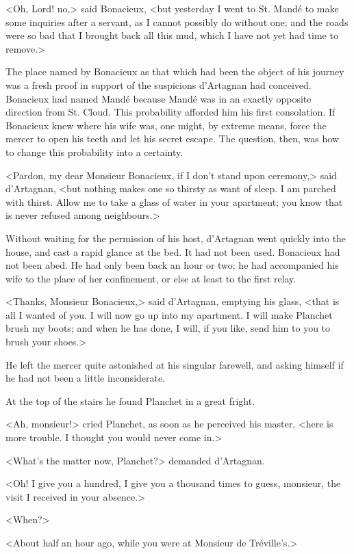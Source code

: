 <Oh, Lord! no,> said Bonacieux, <but yesterday I went to St. Mandé to make some inquiries after a servant, as I cannot possibly do without one; and the roads were so bad that I brought back all this mud, which I have not yet had time to remove.> 

The place named by Bonacieux as that which had been the object of his journey was a fresh proof in support of the suspicions d'Artagnan had conceived. Bonacieux had named Mandé because Mandé was in an exactly opposite direction from St. Cloud. This probability afforded him his first consolation. If Bonacieux knew where his wife was, one might, by extreme means, force the mercer to open his teeth and let his secret escape. The question, then, was how to change this probability into a certainty. 

<Pardon, my dear Monsieur Bonacieux, if I don't stand upon ceremony,> said d'Artagnan, <but nothing makes one so thirsty as want of sleep. I am parched with thirst. Allow me to take a glass of water in your apartment; you know that is never refused among neighbours.> 

Without waiting for the permission of his host, d'Artagnan went quickly into the house, and cast a rapid glance at the bed. It had not been used. Bonacieux had not been abed. He had only been back an hour or two; he had accompanied his wife to the place of her confinement, or else at least to the first relay. 

<Thanks, Monsieur Bonacieux,> said d'Artagnan, emptying his glass, <that is all I wanted of you. I will now go up into my apartment. I will make Planchet brush my boots; and when he has done, I will, if you like, send him to you to brush your shoes.> 

He left the mercer quite astonished at his singular farewell, and asking himself if he had not been a little inconsiderate. 

At the top of the stairs he found Planchet in a great fright. 

<Ah, monsieur!> cried Planchet, as soon as he perceived his master, <here is more trouble. I thought you would never come in.> 

<What's the matter now, Planchet?> demanded d'Artagnan. 

<Oh! I give you a hundred, I give you a thousand times to guess, monsieur, the visit I received in your absence.> 

<When?> 

<About half an hour ago, while you were at Monsieur de Tréville's.> 

